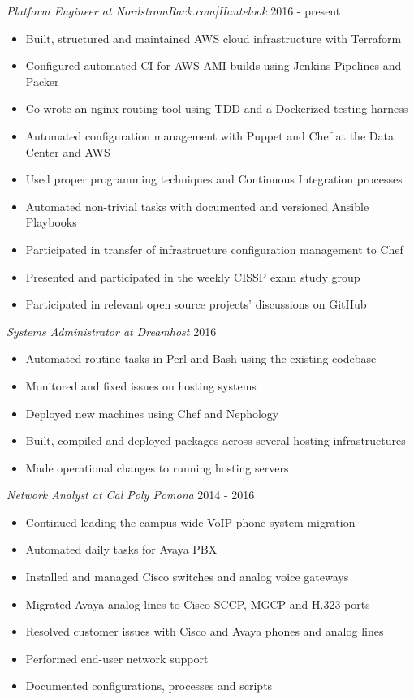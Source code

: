 \documentclass[line]{tex/res}
\begin{document}
\begin{resume}
    {\sl Platform Engineer at NordstromRack.com|Hautelook} \hfill 2016 - present
    \begin{itemize} \itemsep -2pt %
        \item Built, structured and maintained AWS cloud infrastructure with Terraform
        \item Configured automated CI for AWS AMI builds using Jenkins Pipelines and Packer
        \item Co-wrote an nginx routing tool using TDD and a Dockerized testing harness
        \item Automated configuration management with Puppet and Chef at the Data Center and AWS
        \item Used proper programming techniques and Continuous Integration processes
        \item Automated non-trivial tasks with documented and versioned Ansible Playbooks
        \item Participated in transfer of infrastructure configuration management to Chef
        \item Presented and participated in the weekly CISSP exam study group
        \item Participated in relevant open source projects' discussions on GitHub
    \end{itemize}

	{\sl Systems Administrator at Dreamhost} \hfill 2016
	\begin{itemize} \itemsep -2pt
		\item Automated routine tasks in Perl and Bash using the existing codebase
		\item Monitored and fixed issues on hosting systems
		\item Deployed new machines using Chef and Nephology
		\item Built, compiled and deployed packages across several hosting infrastructures
		\item Made operational changes to running hosting servers
	\end{itemize}

	{\sl Network Analyst at Cal Poly Pomona} \hfill 2014 - 2016
	\begin{itemize} \itemsep -2pt
		\item Continued leading the campus-wide VoIP phone system migration
		\item Automated daily tasks for Avaya PBX
		\item Installed and managed Cisco switches and analog voice gateways
		\item Migrated Avaya analog lines to Cisco SCCP, MGCP and H.323 ports
		\item Resolved customer issues with Cisco and Avaya phones and analog lines
		\item Performed end-user network support
		\item Documented configurations, processes and scripts
	\end{itemize}


\end{resume}
\end{document}
